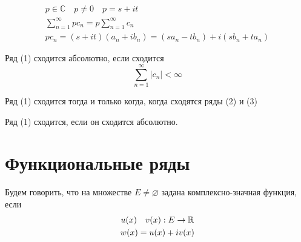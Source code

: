 \documentclass[main]{subfiles}
\begin{document}
\begin{gather*}
    p \in \mathbb{C} \quad p \ne 0 \quad p = s + it \\
    \sum^\infty_{n=1} pc_n = p \sum_{n=1}^\infty c_n \tag{5}\\
    pc_n = (s+it)(a_n + ib_n) = (sa_n-tb_n) + i(sb_n+ ta_n) 
\end{gather*}
\begin{definition}
    Ряд (1) сходится абсолютно, если сходится 
    \[\sum_{n=1}^\infty |c_n| < \infty \tag{6} \]
\end{definition}
\begin{theorem}
    Ряд (1) сходится тогда и только когда, когда сходятся ряды (2) и (3)
\end{theorem}
\begin{corollary}
    Ряд (1) сходится, если он сходится абсолютно.
\end{corollary}

\section{Функциональные ряды}
\begin{definition}
    Будем говорить, что на множестве $E \ne \varnothing$ задана комплексно-значная функция, если
    \begin{gather*}
        u(x) \quad v(x) :  E \rightarrow \mathbb{R} \\
        w(x) = u(x) + i v(x)
    \end{gather*}
\end{definition}
\end{document}
